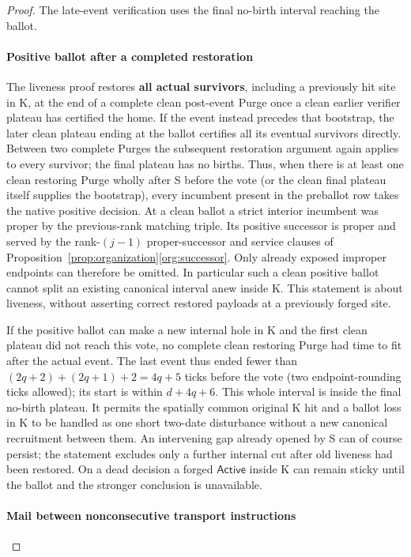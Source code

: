 \begin{proof}
The late-event verification uses the final no-birth interval reaching the ballot.
\paragraph{Positive ballot after a completed restoration}

The liveness proof restores \textbf{all actual survivors}, including a previously hit site in K, at the end of a complete clean post-event Purge once a clean earlier verifier plateau has certified the home. If the event instead precedes that bootstrap, the later clean plateau ending at the ballot certifies all its eventual survivors directly. Between two complete Purges the subsequent restoration argument again applies to every survivor; the final plateau has no births. Thus, when there is at least one clean restoring Purge wholly after S before the vote (or the clean final plateau itself supplies the bootstrap), every incumbent present in the preballot row takes the native positive decision. At a clean ballot a strict interior incumbent was proper by the previous-rank matching triple. Its positive successor is proper and served by the rank-\((j-1)\) proper-successor and service clauses of Proposition~\ref{prop:organization}\ref{org:successor}. Only already exposed improper endpoints can therefore be omitted. In particular such a clean positive ballot cannot split an existing canonical interval anew inside K. This statement is about liveness, without asserting correct restored payloads at a previously forged site.

If the positive ballot can make a new internal hole in K and the first clean plateau did not reach this vote, no complete clean restoring Purge had time to fit after the actual event. The last event thus ended fewer than \((2q+2)+(2q+1)+2=4q+5\) ticks before the vote (two endpoint-rounding ticks allowed); its start is within \(d+4q+6\). This whole interval is inside the final no-birth plateau. It permits the spatially common original K hit and a ballot loss in K to be handled as one short two-date disturbance without a new canonical recruitment between them. An intervening gap already opened by S can of course persist; the statement excludes only a further internal cut after old liveness had been restored. On a dead decision a forged \(\mathsf{Active}\) inside K can remain sticky until the ballot and the stronger conclusion is unavailable.
\paragraph{Mail between nonconsecutive transport instructions}


\end{proof}
